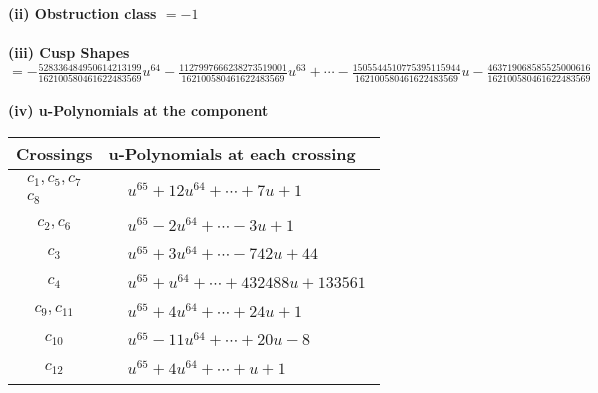 \documentclass[1p]{elsarticle_modified}
\theoremstyle{definition}
\begin{document}
\flushleft \textbf{(ii) Obstruction class $= -1$}\\~\\
\flushleft \textbf{(iii) Cusp Shapes $= -\frac{528336484950614213199}{162100580461622483569} u^{64}-\frac{1127997666238273519001}{162100580461622483569} u^{63}+\cdots-\frac{1505544510775395115944}{162100580461622483569} u-\frac{463719068585525000616}{162100580461622483569}$}\\~\\
\newpage\renewcommand{\arraystretch}{1}
\flushleft \textbf{(iv) u-Polynomials at the component}\newline \\
\begin{tabular}{m{50pt}|m{274pt}}
Crossings & \hspace{64pt}u-Polynomials at each crossing \\
\hline $$\begin{aligned}c_{1},c_{5},c_{7}\\c_{8}\end{aligned}$$&$\begin{aligned}
&u^{65}+12 u^{64}+\cdots+7 u+1
\end{aligned}$\\
\hline $$\begin{aligned}c_{2},c_{6}\end{aligned}$$&$\begin{aligned}
&u^{65}-2 u^{64}+\cdots-3 u+1
\end{aligned}$\\
\hline $$\begin{aligned}c_{3}\end{aligned}$$&$\begin{aligned}
&u^{65}+3 u^{64}+\cdots-742 u+44
\end{aligned}$\\
\hline $$\begin{aligned}c_{4}\end{aligned}$$&$\begin{aligned}
&u^{65}+u^{64}+\cdots+432488 u+133561
\end{aligned}$\\
\hline $$\begin{aligned}c_{9},c_{11}\end{aligned}$$&$\begin{aligned}
&u^{65}+4 u^{64}+\cdots+24 u+1
\end{aligned}$\\
\hline $$\begin{aligned}c_{10}\end{aligned}$$&$\begin{aligned}
&u^{65}-11 u^{64}+\cdots+20 u-8
\end{aligned}$\\
\hline $$\begin{aligned}c_{12}\end{aligned}$$&$\begin{aligned}
&u^{65}+4 u^{64}+\cdots+u+1
\end{aligned}$\\
\hline
\end{tabular}\\~\\
\end{document}
